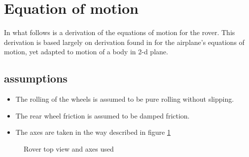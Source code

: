 \documentclass{article}
\begin{document}
	\section{Equation of motion}
	\paragraph{}In what follows is a derivation of the equations of motion for the rover. This derivation is based largely on derivation found in \cite{nelson} for the airplane's equations of motion, yet adapted to motion of a body in 2-d plane.
	
	\subsection*{assumptions}
	\begin{itemize}
		\item The rolling of the wheels is assumed to be pure rolling without slipping.
		\item The rear wheel friction is assumed to be damped friction. 
		\item The axes are taken in the way described in figure \ref{fig:topView}
	\end{itemize}
	\begin{figure}[H]
		\centering
		\def\svgwidth{200pt}
		
		\caption{Rover top view and axes used}
		\label{fig:topView}
	\end{figure}
\end{document}
